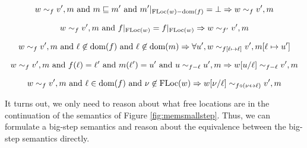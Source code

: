 \documentclass{article}
\begin{document}
\begin{lem}
  \[w\sim_f v',m\text{ and }m\sqsubseteq m'\text{ and }m'|_{\text{FLoc}(w)-\text{dom}(f)}=\bot\Rightarrow w\sim_f v',m\]
\end{lem}

\begin{lem}
  \[w\sim_f v',m\text{ and }f|_{\text{FLoc}(w)}=f|_{\text{FLoc}(w)}\Rightarrow w\sim_{f'}v',m\]
\end{lem}

\begin{lem}
  \[w\sim_f v',m\text{ and }\ell\not\in\text{dom}(f)\text{ and }\ell\not\in\text{dom}(m)\Rightarrow\forall u',w\sim_{f[\ell\mapsto\ell]}v',m[\ell\mapsto u']\]
\end{lem}

\begin{lem}
  \[w\sim_f v',m\text{ and }f(\ell)=\ell'\text{ and }m(\ell')=u'\text{ and }u\sim_{f-\ell}u',m\Rightarrow w[u/\ell]\sim_{f-\ell}v',m\]
\end{lem}

\begin{lem}
  \[w\sim_f v',m\text{ and }\ell\in\text{dom}(f)\text{ and }\nu\not\in\text{FLoc}(w)\Rightarrow w[\nu/\ell]\sim_{f\circ(\nu\leftrightarrow\ell)}v',m\]
\end{lem}

It turns out, we only need to reason about what free locations are in the continuation of the semantics of Figure \ref{fig:memsmallstep}.
Thus, we can formulate a big-step semantics and reason about the equivalence between the big-step semantics directly.
\end{document}
